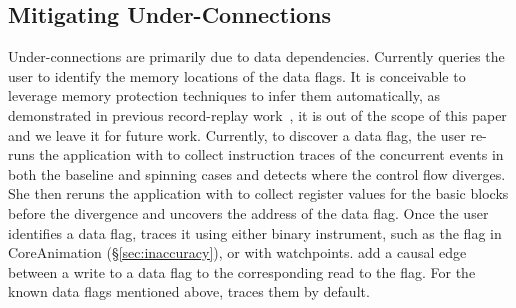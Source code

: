 \subsection{Mitigating Under-Connections}\label{subsec:fix-under}

Under-connections are primarily due to data dependencies.  Currently \xxx
queries the user to identify the memory locations of the data flags. It
is conceivable to leverage memory protection techniques to infer them
automatically, as demonstrated in previous record-replay
work~\cite{king2005debugging, dunlap2008execution}, it is out of the scope
of this paper and we leave it for future work. Currently, to discover a data
flag, the user re-runs the application with \xxx to collect instruction traces
of the concurrent events in both the baseline and spinning cases and detects
where the control flow diverges. She then reruns the application with \xxx to
collect register values for the basic blocks before the divergence and uncovers
the address of the data flag. Once the user identifies a data flag, \xxx traces
it using either binary instrument, such as the  flag in
CoreAnimation (\S\ref{sec:inaccuracy}), or with watchpoints. \xxx add a causal
edge between a write to a data flag to the corresponding read to the flag.
For the known data flags mentioned above, \xxx traces them by default.
